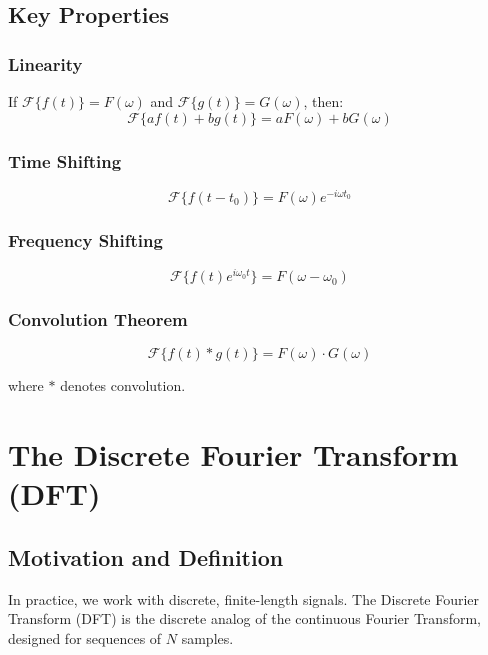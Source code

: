 \documentclass[11pt,a4paper]{article}
\begin{document}
\subsection{Key Properties}

\subsubsection{Linearity}
If $\mathcal{F}\{f(t)\} = F(\omega)$ and $\mathcal{F}\{g(t)\} = G(\omega)$, then:
\begin{equation}
\mathcal{F}\{af(t) + bg(t)\} = aF(\omega) + bG(\omega)
\end{equation}

\subsubsection{Time Shifting}
\begin{equation}
\mathcal{F}\{f(t-t_0)\} = F(\omega)e^{-i\omega t_0}
\end{equation}

\subsubsection{Frequency Shifting}
\begin{equation}
\mathcal{F}\{f(t)e^{i\omega_0 t}\} = F(\omega - \omega_0)
\end{equation}

\subsubsection{Convolution Theorem}
\begin{equation}
\mathcal{F}\{f(t) * g(t)\} = F(\omega) \cdot G(\omega)
\end{equation}

where $*$ denotes convolution.

\section{The Discrete Fourier Transform (DFT)}

\subsection{Motivation and Definition}

In practice, we work with discrete, finite-length signals. The Discrete Fourier Transform (DFT) is the discrete analog of the continuous Fourier Transform, designed for sequences of $N$ samples.
\end{document}

